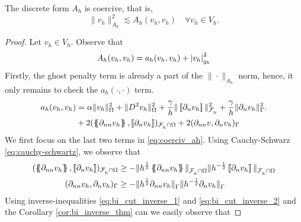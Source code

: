 \begin{lemma}
    \label{lemma:bi_Ah_coercive}
    The discrete form $A_{h}$ is coercive, that is, \[
    \| v_{h} \|_{ A_{h} }^{ 2 }  \lesssim A_{h}( v_{h},v_{h})\quad  \forall v_{h} \in V_{h}.
    \]
\end{lemma}

\begin{proof}
    Let $v_{h} \in V_{h}$.
    Observe that
    \begin{equation}
    A_{h}( v_{h},v_{h}) = a_{h}( v_{h},v_{h})  + \left\lvert  v_{h}  \right\rvert_{g_{h}}^{2}
    \end{equation}
    Firstly, the ghost penalty term is already a part of the $\| \cdot  \|_{ A_{h} }^{  } $ norm, hence, it only remains to check the $a_{h}( \cdot ,\cdot ) $ term.
    \begin{equation}
        \label{eq:coerciv_ah}
    \begin{split}
       a_{h}( v_{h},v_{h}) &=   \alpha \| v_{h} \|_{   \Omega   }^{2} + \| D^2v_{h} \|_{   \Omega  }^{2  }  + \frac{\gamma }{h}  \|  \jump{ \partial _{n} v_{h} }\|_{\mathcal{F} _{h}^{}  }^{ 2 } + \frac{\gamma }{h}  \| \partial _{n} v_{h} \|_{ \Gamma  }^{ 2 }. \\
                   & + 2 ( \mean{ \partial _{nn} v_{h} }, \jump{ \partial _{n} v_{h} }    )_{\mathcal{F} ^{}_{h} \cap \Omega }  + 2 (  \partial _{nn} v ,
       \partial _{n} v_{h}  )_{\Gamma } \\
    \end{split}
    \end{equation}
    We first focus on the last two terms in \eqref{eq:coerciv_ah}. Using Cauchy-Schwarz \eqref{eq:cauchy-schwartz}, we observe that
    \begin{equation}
        \begin{split}
    ( \mean{ \partial _{nn} v_{h} }  , \jump{ \partial _{n} v_{h} }  )_{\mathcal{F}^{}_{h}\cap \Omega  } & \ge - \| h^{\frac{1}{2}}\mean{ \partial _{nn} v_{h} }   \|_{ \mathcal{F}^{}_{h}\cap \Omega   }^{  }  \|h^{-\frac{1}{2}} \jump{ \partial _{n} v_{h} }   \|_{
    \mathcal{F}^{}_{h}\cap \Omega   }^{  } \\
    (  \partial _{nn} v_{h}   ,  \partial _{n} v_{h}   )_{\Gamma   } & \ge - \| h^{\frac{1}{2}} \partial _{nn} v_{h}    \|_{ \Gamma    }^{  }  \|h^{-\frac{1}{2}}  \partial _{n} v_{h}    \|_{ \Gamma    }^{  }
        \end{split}
    \end{equation}
    Using inverse-inequalities \eqref{eq:bi_cut_inverse_1} and \eqref{eq:bi_cut_inverse_2} and the Corollary \ref{cor:bi_inverse_thm} can we easily observe that

\end{proof}
